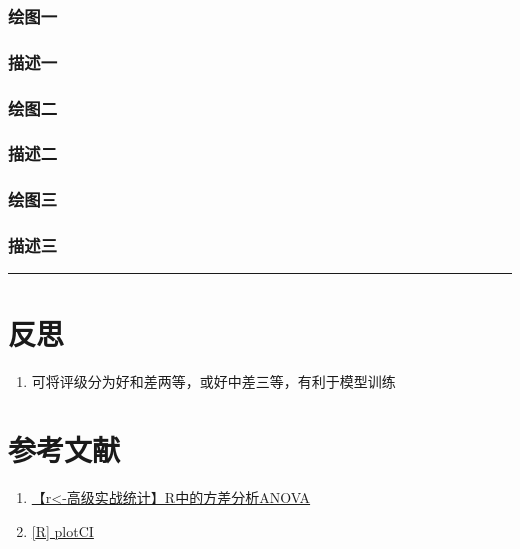 \documentclass[]{article}
\providecommand{\tightlist}{%
  \setlength{\itemsep}{0pt}\setlength{\parskip}{0pt}}
\begin{document}
\subsubsection{绘图一}

\subsubsection{描述一}

\subsubsection{绘图二}

\subsubsection{描述二}

\subsubsection{绘图三}

\subsubsection{描述三}

\begin{center}\rule{0.5\linewidth}{\linethickness}\end{center}

\section{反思}

\begin{enumerate}
\def\labelenumi{\arabic{enumi}.}
\tightlist
\item
  可将评级分为好和差两等，或好中差三等，有利于模型训练
\end{enumerate}

\section{参考文献}

\begin{enumerate}
\def\labelenumi{\arabic{enumi}.}
\tightlist
\item
  \href{https://www.jianshu.com/p/aa80b6f65399}{【r\textless{}-高级\textbar{}实战\textbar{}统计】R中的方差分析ANOVA}
\item
  \href{http://r.789695.n4.nabble.com/R-plotCI-td808532.html}{{[}R{]}
  plotCI}
\end{enumerate}
\end{document}
